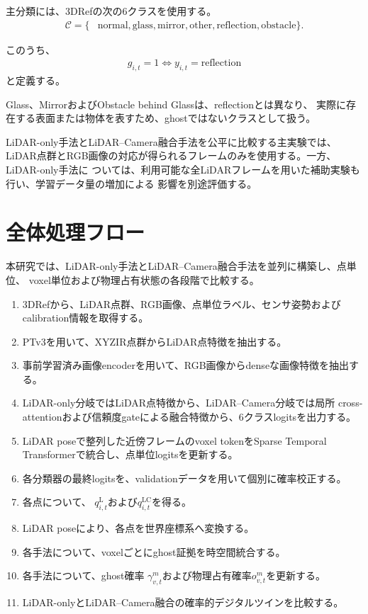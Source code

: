 \documentclass[uplatex,a4paper,11pt]{jsarticle}
\begin{document}
主分類には、3DRefの次の6クラスを使用する。
\begin{align}
  \mathcal{C}
  =
  \{&
    \mathrm{normal},
    \mathrm{glass},
    \mathrm{mirror},
    \mathrm{other},
    \mathrm{reflection},
    \mathrm{obstacle}
  \}.
\end{align}

このうち、
\begin{align}
  g_{i,t}=1
  \iff
  y_{i,t}
  =
  \mathrm{reflection}
\end{align}
と定義する。

Glass、MirrorおよびObstacle behind Glassは、reflectionとは異なり、
実際に存在する表面または物体を表すため、ghostではないクラスとして扱う。

LiDAR-only手法とLiDAR--Camera融合手法を公平に比較する主実験では、
LiDAR点群とRGB画像の対応が得られるフレームのみを使用する。一方、LiDAR-only手法に
ついては、利用可能な全LiDARフレームを用いた補助実験も行い、学習データ量の増加による
影響を別途評価する。

\section{全体処理フロー}

本研究では、LiDAR-only手法とLiDAR--Camera融合手法を並列に構築し、点単位、
voxel単位および物理占有状態の各段階で比較する。

\begin{enumerate}
  \item 3DRefから、LiDAR点群、RGB画像、点単位ラベル、センサ姿勢および
        calibration情報を取得する。
  \item PTv3を用いて、XYZIR点群からLiDAR点特徴を抽出する。
  \item 事前学習済み画像encoderを用いて、RGB画像からdenseな画像特徴を抽出する。
  \item LiDAR-only分岐ではLiDAR点特徴から、LiDAR--Camera分岐では局所
        cross-attentionおよび信頼度gateによる融合特徴から、6クラスlogitsを出力する。
  \item LiDAR poseで整列した近傍フレームのvoxel tokenをSparse Temporal
        Transformerで統合し、点単位logitsを更新する。
  \item 各分類器の最終logitsを、validationデータを用いて個別に確率校正する。
  \item 各点について、
        $q_{i,t}^{\mathrm{L}}$および$q_{i,t}^{\mathrm{LC}}$を得る。
  \item LiDAR poseにより、各点を世界座標系へ変換する。
  \item 各手法について、voxelごとにghost証拠を時空間統合する。
  \item 各手法について、ghost確率
        $\gamma_{v,t}^{m}$および物理占有確率$o_{v,t}^{m}$を更新する。
  \item LiDAR-onlyとLiDAR--Camera融合の確率的デジタルツインを比較する。
\end{enumerate}
\end{document}
